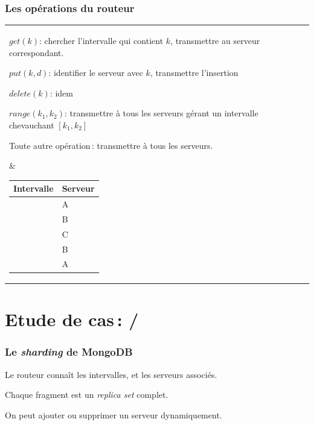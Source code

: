\begin{frame}
\frametitle{Les opérations du routeur}

\begin{tabular}{l|p{6cm}}
   \parbox{5cm}{
$get(k)$: chercher l'intervalle qui contient $k$, transmettre
au serveur correspondant.

\smallskip

$put(k, d)$: identifier le serveur avec $k$, transmettre l'insertion
 
 \smallskip
 
 $delete(k)$: idem
 
 \smallskip
 
 $range(k_1, k_2)$: transmettre à tous les serveurs gérant un intervalle chevauchant $[k_1, k_2]$
 
 \smallskip
 
 Toute autre opération\,: transmettre à tous les serveurs.
   }  %
  & 
  \parbox{6cm}{
 
\begin{tabular}{r|l}
Intervalle  & Serveur\\
\hline
$]-\infty, a]$ & A  \\
$[a+1, b]$ & B  \\
$[b+1, c]$ & C  \\
$[c+1, d]$ & B  \\
$[d+1, \infty[$ & A  \\
\hline
\end{tabular}

}

\end{tabular}

\end{frame}


\section{Etude de cas\,: \mongodb/}


\begin{frame}
\frametitle{Le \textit{sharding} de MongoDB}

Le routeur connaît les intervalles, et les serveurs associés.


\vfill

\begin{redbullet}
   \item Chaque fragment est un \textit{replica set} complet.
   \item On peut ajouter ou supprimer un serveur dynamiquement.
\end{redbullet}

\end{frame}


